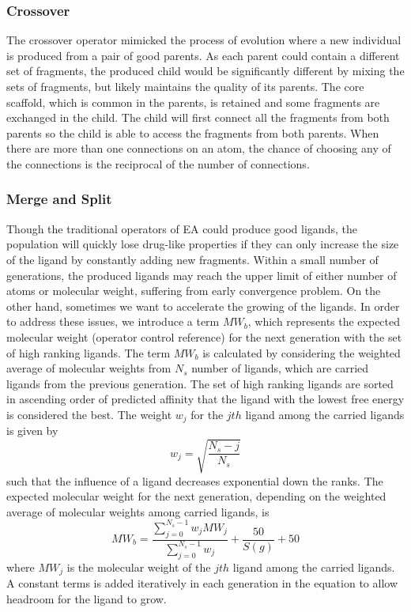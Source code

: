 \documentclass[10pt,conference,letterpaper]{IEEEtran}
\begin{document}
\subsubsection{Crossover}
The crossover operator mimicked the process of evolution where a new individual is produced from a pair of good parents.
As each parent could contain a different set of fragments, the produced child would be significantly different by mixing the sets of fragments, but likely maintains the quality of its parents.
The core scaffold, which is common in the parents, is retained and some fragments are exchanged in the child.
The child will first connect all the fragments from both parents so the child is able to access the fragments from both parents.
When there are more than one connections on an atom, the chance of choosing any of the connections is the reciprocal of the number of connections.

\subsubsection{Merge and Split}
Though the traditional operators of EA could produce good ligands, the population will quickly lose drug-like properties if they can only increase the size of the ligand by constantly adding new fragments. Within a small number of generations, the produced ligands may reach the upper limit of either number of atoms or molecular weight, suffering from early convergence problem.
On the other hand, sometimes we want to accelerate the growing of the ligands.
In order to address these issues, we introduce a term $MW_{b}$, which represents the expected molecular weight (operator control reference) for the next generation with the set of high ranking ligands.
The term $MW_{b}$ is calculated by considering the weighted average of molecular weights from $N_{s}$ number of ligands, which are carried ligands from the previous generation.
The set of high ranking ligands are sorted in ascending order of predicted affinity that the ligand with the lowest free energy is considered the best.
The weight $w_{j}$ for the $jth$ ligand among the carried ligands is given by
\begin{equation}
w_{j} = \sqrt{\frac{N_{s}-j}{N_{s}}} \label{eqn:05}
\end{equation}
such that the influence of a ligand decreases exponential down the ranks.
The expected molecular weight for the next generation, depending on the weighted average of molecular weights among carried ligands, is
\begin{equation}
MW_{b} = \frac{\sum_{j=0}^{N_{s}-1}w_{j}MW_{j}}{\sum_{j=0}^{N_{s}-1}w_{j}}+\frac{50}{S(g)}+50 \label{eqn:06}
\end{equation}
where $MW_{j}$ is the molecular weight of the $jth$ ligand among the carried ligands.
A constant terms is added iteratively in each generation in the equation to allow headroom for the ligand to grow.
\end{document}

